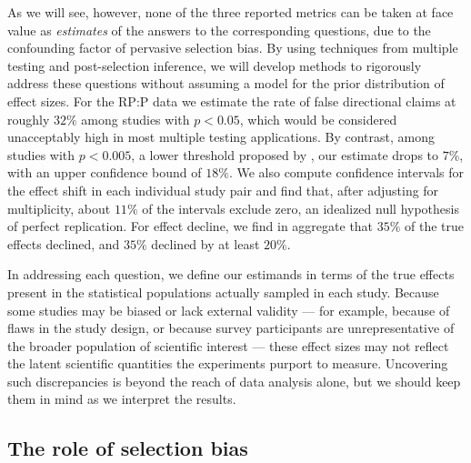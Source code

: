 \documentclass[11pt]{article}
\theoremstyle{definition}
\theoremstyle{custom}
\begin{document}
  As we will see, however, none of the three reported metrics can be taken at face value as {\em estimates} of the answers to the corresponding questions, due to the confounding factor of pervasive selection bias. By using techniques from multiple testing and post-selection inference, we will develop methods to rigorously address these questions without assuming a model for the prior distribution of effect sizes. For the RP:P data we estimate the rate of false directional claims at roughly $32\%$ among studies with $p < 0.05$, which would be considered unacceptably high in most multiple testing applications. By contrast, among studies with $p < 0.005$, a lower threshold proposed by \citet{Benjamin:2018gh}, our estimate drops to $7\%$, with an upper confidence bound of $18\%$. We also compute confidence intervals for the effect shift in each individual study pair and find that, after adjusting for multiplicity, about $11\%$ of the intervals exclude zero, an idealized null hypothesis of perfect replication. For effect decline, we find in aggregate that $35\%$ of the true effects declined, and $35\%$ declined by at least $20\%$.

  In addressing each question, we define our estimands in terms of the true effects present in the statistical populations actually sampled in each study. Because some studies may be biased or lack external validity --- for example, because of flaws in the study design, or because survey participants are unrepresentative of the broader population of scientific interest --- these effect sizes may not reflect the latent scientific quantities the experiments purport to measure. Uncovering such discrepancies is beyond the reach of data analysis alone, but we should keep them in mind as we interpret the results.

\subsection{The role of selection bias}
\end{document}

